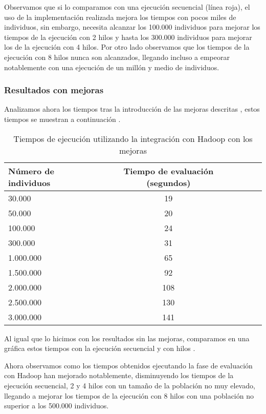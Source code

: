 Observamos que si lo comparamos con una ejecuci\'on secuencial (l\'inea roja), el uso de la implementaci\'on realizada mejora los tiempos con pocos miles de individuos, sin embargo, necesita alcanzar los 100.000 individuos para mejorar los tiempos de la ejecución con 2 hilos y hasta los 300.000 individuos para mejorar los de la ejecución con 4 hilos. Por otro lado observamos que los tiempos de la ejecución con 8 hilos nunca son alcanzados, llegando incluso a empeorar notablemente con una ejecución de un millón y medio de individuos.

 \subsubsection{Resultados con mejoras}

Analizamos ahora los tiempos tras la introducción de las mejoras descritas , estos tiempos se muestran a continuación .

\begin{table}[H]
  \begin{center}
    \begin{center}
    \begin{tabular}{l | c c c c}
    N\'umero de individuos & Tiempo de evaluaci\'on (segundos) \\ \hline
    30.000 & 19\\
    50.000 & 20\\
    100.000 & 24\\
    300.000 & 31\\
    1.000.000 & 65\\
    1.500.000 & 92\\
    2.000.000 & 108\\
    2.500.000 & 130\\
    3.000.000 & 141\\
    \end{tabular}
    \end{center}
    \caption{Tiempos de ejecución utilizando la integración con Hadoop con los mejoras}
    \label{tabla_tiempos_hadoop_con_mejoras}
  \end{center}
\end{table}

Al igual que lo hicimos con los resultados sin las mejoras, comparamos en una gráfica estos tiempos con la ejecución secuencial y con hilos .


Ahora observamos como los tiempos obtenidos ejecutando la fase de evaluación con Hadoop han mejorado notablemente, disminuyendo los tiempos de la ejecución secuencial, 2 y 4 hilos con un tamaño de la población no muy elevado, llegando a mejorar los tiempos de la ejecuci\'on con 8 hilos con una población no superior a los 500.000 individuos.




